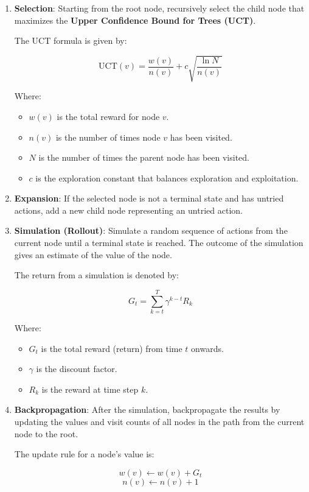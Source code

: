 \documentclass[
]{book}
\providecommand{\tightlist}{%
  \setlength{\itemsep}{0pt}\setlength{\parskip}{0pt}}
\begin{document}
\begin{enumerate}
\def\labelenumi{\arabic{enumi}.}
\item
  \textbf{Selection}: Starting from the root node, recursively select the child node that maximizes the \textbf{Upper Confidence Bound for Trees (UCT)}.

  The UCT formula is given by:

  \[
  \text{UCT}(v) = \frac{w(v)}{n(v)} + c \sqrt{\frac{\ln N}{n(v)}}
  \]

  Where:

  \begin{itemize}
  \tightlist
  \item
    \(w(v)\) is the total reward for node \(v\).
  \item
    \(n(v)\) is the number of times node \(v\) has been visited.
  \item
    \(N\) is the number of times the parent node has been visited.
  \item
    \(c\) is the exploration constant that balances exploration and exploitation.
  \end{itemize}
\item
  \textbf{Expansion}: If the selected node is not a terminal state and has untried actions, add a new child node representing an untried action.
\item
  \textbf{Simulation (Rollout)}: Simulate a random sequence of actions from the current node until a terminal state is reached. The outcome of the simulation gives an estimate of the value of the node.

  The return from a simulation is denoted by:

  \[
  G_t = \sum_{k=t}^{T} \gamma^{k-t} R_k
  \]

  Where:

  \begin{itemize}
  \tightlist
  \item
    \(G_t\) is the total reward (return) from time \(t\) onwards.
  \item
    \(\gamma\) is the discount factor.
  \item
    \(R_k\) is the reward at time step \(k\).
  \end{itemize}
\item
  \textbf{Backpropagation}: After the simulation, backpropagate the results by updating the values and visit counts of all nodes in the path from the current node to the root.

  The update rule for a node's value is:

  \[
  w(v) \leftarrow w(v) + G_t
  \]
  \[
  n(v) \leftarrow n(v) + 1
  \]
\end{enumerate}
\end{document}
